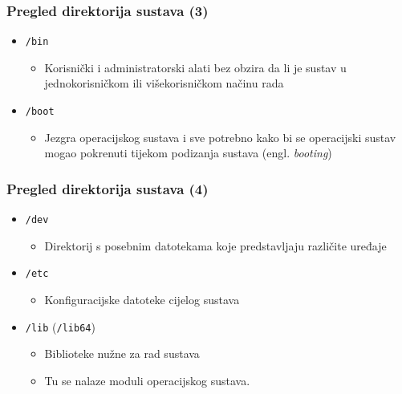 \documentclass{beamer}
\begin{document}
\begin{frame}[t]
\frametitle{Pregled direktorija sustava (3)}
\begin{itemize}
  \item[] \texttt{/bin}
  \begin{itemize}
    \item Korisnički i administratorski alati bez obzira da li je sustav u
          jednokorisničkom ili višekorisničkom načinu rada
  \end{itemize}
  \item[] \texttt{/boot}
  \begin{itemize}
    \item Jezgra operacijskog sustava i sve potrebno kako bi se operacijski
          sustav mogao pokrenuti tijekom podizanja sustava
          (engl. \emph{booting})
  \end{itemize}
\end{itemize}
\end{frame}

\begin{frame}[t]
\frametitle{Pregled direktorija sustava (4)}
\begin{itemize}
  \item \texttt{/dev}
  \begin{itemize}
    \item Direktorij s posebnim datotekama koje predstavljaju različite
          uređaje
  \end{itemize}
  \item \texttt{/etc}
  \begin{itemize}
    \item Konfiguracijske datoteke cijelog sustava
  \end{itemize}
  \item \texttt{/lib} (\texttt{/lib64})
  \begin{itemize}
    \item Biblioteke nužne za rad sustava
    \item Tu se nalaze moduli operacijskog sustava.
  \end{itemize}
\end{itemize}
\end{frame}
\end{document}
